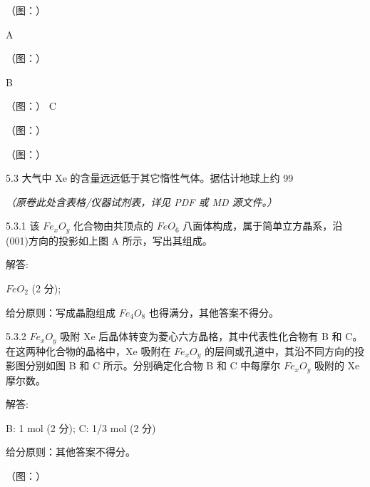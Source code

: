（图：）

A

（图：）

B

（图：）
C

（图：）

（图：）

5.3 大气中 Xe 的含量远远低于其它惰性气体。据估计地球上约 99%

\textit{（原卷此处含表格/仪器试剂表，详见 PDF 或 MD 源文件。）}

5.3.1 该 $Fe_{x}O_{y}$ 化合物由共顶点的 $FeO_{6}$ 八面体构成，属于简单立方晶系，沿(001)方向的投影如上图 A 所示，写出其组成。

解答:

$FeO_{2}$ (2 分);

给分原则：写成晶胞组成 $Fe_{4}O_{8}$ 也得满分，其他答案不得分。

5.3.2 $Fe_{x}O_{y}$ 吸附 Xe 后晶体转变为菱心六方晶格，其中代表性化合物有 B 和 C。在这两种化合物的晶格中，Xe 吸附在 $Fe_{x}O_{y}$ 的层间或孔道中，其沿不同方向的投影图分别如图 B 和 C 所示。分别确定化合物 B 和 C 中每摩尔 $Fe_{x}O_{y}$ 吸附的 Xe 摩尔数。

解答:

B: 1 mol (2 分); C: 1/3 mol (2 分)

给分原则：其他答案不得分。

（图：）
